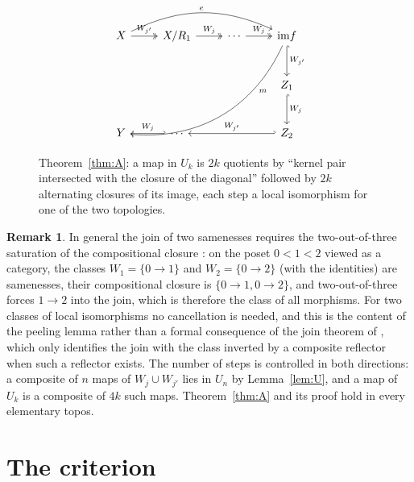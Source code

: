 \documentclass[11pt]{amsart}
\theoremstyle{definition}
\newtheorem{rem}[thm]{Remark}
\newcommand{\im}{\mathrm{im}}
\begin{document}
\begin{figure}[ht]
\[
\begin{tikzcd}[column sep=normal,row sep=large]
X\arrow[r,two heads,"W_{j'}"]\arrow[rrr,bend left=25,"e"] & X/R_1\arrow[r,two heads,"W_j"] & \cdots\arrow[r,two heads,"W_j"] & \im f\arrow[d,hook,"W_{j'}"]\arrow[ddlll,bend left=35,"m"{near start}]\\
& & & Z_1\arrow[d,hook,"W_j"]\\
Y & \cdots\arrow[l,hook',"W_j"'] & & Z_2\arrow[ll,hook',"W_{j'}"']
\end{tikzcd}
\]
\caption{Theorem~\ref{thm:A}: a map in $U_k$ is $2k$ quotients by
``kernel pair intersected with the closure of the diagonal'' followed by
$2k$ alternating closures of its image, each step a local isomorphism for
one of the two topologies.}
\end{figure}

\begin{rem}
In general the join of two samenesses requires the two-out-of-three
saturation of the compositional closure \cite{Same}: on the poset
$0<1<2$ viewed as a category, the classes $W_1=\{0\to1\}$ and
$W_2=\{0\to2\}$ (with the identities) are samenesses, their compositional
closure is $\{0\to1,0\to2\}$, and two-out-of-three forces $1\to2$ into the
join, which is therefore the class of all morphisms. For two classes of
local isomorphisms no cancellation is needed, and this is the content of
the peeling lemma rather than a formal consequence of the join theorem of
\cite[Thm.~4.1]{Postnikov}, which only identifies the join with the class
inverted by a composite reflector when such a reflector exists. The number of steps is controlled in both directions: a composite of
$n$ maps of $W_j\cup W_{j'}$ lies in $U_n$ by Lemma~\ref{lem:U}, and a map of
$U_k$ is a composite of $4k$ such maps. Theorem~\ref{thm:A} and its proof
hold in every elementary topos.
\end{rem}

\section{The criterion}\label{sec:criterion}
\end{document}

